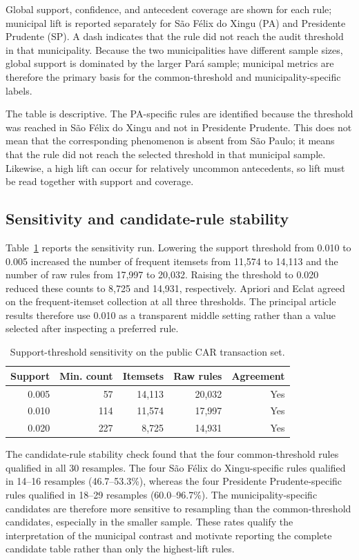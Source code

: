 \documentclass[11pt]{article}
\begin{document}
Global support, confidence, and antecedent coverage are shown for each rule; municipal lift is reported separately for São Félix do Xingu (PA) and Presidente Prudente (SP). A dash indicates that the rule did not reach the audit threshold in that municipality. Because the two municipalities have different sample sizes, global support is dominated by the larger Pará sample; municipal metrics are therefore the primary basis for the common-threshold and municipality-specific labels.

The table is descriptive. The PA-specific rules are identified because the threshold was reached in São Félix do Xingu and not in Presidente Prudente. This does not mean that the corresponding phenomenon is absent from São Paulo; it means that the rule did not reach the selected threshold in that municipal sample. Likewise, a high lift can occur for relatively uncommon antecedents, so lift must be read together with support and coverage.

\subsection{Sensitivity and candidate-rule stability}

Table~\ref{tab:sensitivity} reports the sensitivity run. Lowering the support threshold from 0.010 to 0.005 increased the number of frequent itemsets from 11,574 to 14,113 and the number of raw rules from 17,997 to 20,032. Raising the threshold to 0.020 reduced these counts to 8,725 and 14,931, respectively. Apriori and Eclat agreed on the frequent-itemset collection at all three thresholds. The principal article results therefore use 0.010 as a transparent middle setting rather than a value selected after inspecting a preferred rule.

\begin{table}[t]
\centering
\small
\caption{Support-threshold sensitivity on the public CAR transaction set.}
\label{tab:sensitivity}
\begin{tabular}{rrrrr}
\toprule
Support & Min. count & Itemsets & Raw rules & Agreement \\
\midrule
0.005 & 57  & 14,113 & 20,032 & Yes \\
0.010 & 114 & 11,574 & 17,997 & Yes \\
0.020 & 227 & 8,725  & 14,931 & Yes \\
\bottomrule
\end{tabular}
\end{table}

The candidate-rule stability check found that the four common-threshold rules qualified in all 30 resamples. The four São Félix do Xingu-specific rules qualified in 14--16 resamples (46.7--53.3\%), whereas the four Presidente Prudente-specific rules qualified in 18--29 resamples (60.0--96.7\%). The municipality-specific candidates are therefore more sensitive to resampling than the common-threshold candidates, especially in the smaller sample. These rates qualify the interpretation of the municipal contrast and motivate reporting the complete candidate table rather than only the highest-lift rules.
\end{document}
